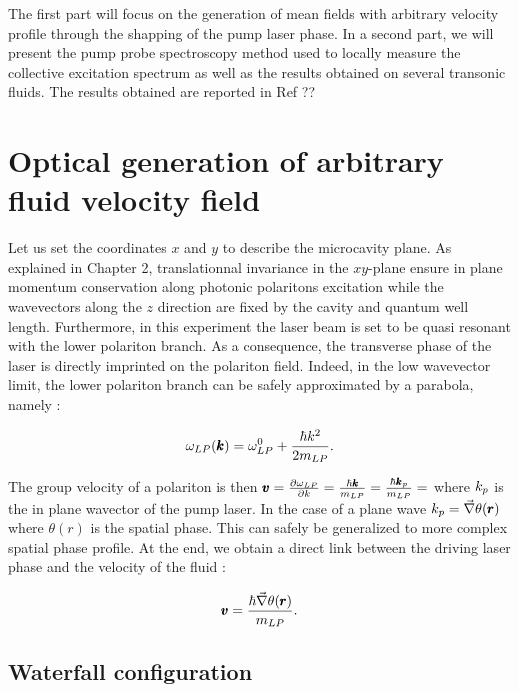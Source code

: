 The first part will focus on the generation of mean fields with arbitrary velocity profile through the shapping of the pump laser phase. In a second part, we will present the pump probe spectroscopy method used to locally measure the collective excitation spectrum as well
as the results obtained on several transonic fluids. The results obtained are reported in Ref ??

\section{Optical generation of arbitrary fluid velocity field}


Let us set the coordinates $x$ and $y$ to describe the microcavity plane. As explained in Chapter 2, translationnal invariance in the $xy$-plane ensure in plane momentum conservation along photonic polaritons excitation while the wavevectors along the
$z$ direction are fixed by the cavity and quantum well length. Furthermore, in this experiment the laser beam is set to be quasi resonant with the lower polariton branch. As a consequence, the transverse phase of the laser is directly imprinted on the polariton field.
Indeed, in the low wavevector limit, the lower polariton branch can be safely approximated by a parabola, namely :

\begin{equation}
    \omega_{LP}(\pmb{k}) = \omega_{LP}^0 + \dfrac{\hbar k^2}{2m_{LP}}.
\end{equation}

The group velocity of a polariton is then $\pmb{v} = \frac{\partial \omega_{LP}}{\partial k} = \frac{\hbar \pmb{k}}{m_{LP}}= \frac{\hbar \pmb{k}_p}{m_{LP}}=$ where $k_p$ is the in plane wavector of the pump laser.
In the case of a plane wave $k_p=\vec{\nabla}\theta(\pmb{r})$ where $\theta(r)$ is the spatial phase. This can safely be generalized to more complex spatial phase profile.
At the end, we obtain a direct link between the driving laser phase and the velocity of the fluid :

\begin{equation}
    \pmb{v} = \dfrac{\hbar \vec{\nabla} \theta(\pmb{r})}{m_{LP}} .
\end{equation}

\subsection{Waterfall configuration}

